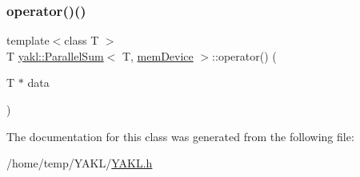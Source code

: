 \mbox{\label{classyakl_1_1ParallelSum_3_01T_00_01memDevice_01_4_ac1f128e9b41ed4993ff2d5889af1b1f2}} 
\subsubsection{\texorpdfstring{operator()()}{operator()()}}
{\footnotesize\ttfamily template$<$class T $>$ \\
T \hyperlink{classyakl_1_1ParallelSum}{yakl\+::\+Parallel\+Sum}$<$ T, \hyperlink{namespaceyakl_ac3c32aec58c61e7f870081477ceee883}{mem\+Device} $>$\+::operator() (\begin{DoxyParamCaption}\item[{T $\ast$}]{data }\end{DoxyParamCaption})\hspace{0.3cm}{\ttfamily [inline]}}



The documentation for this class was generated from the following file\+:\begin{DoxyCompactItemize}
\item 
/home/temp/\+Y\+A\+K\+L/\hyperlink{YAKL_8h}{Y\+A\+K\+L.\+h}\end{DoxyCompactItemize}
